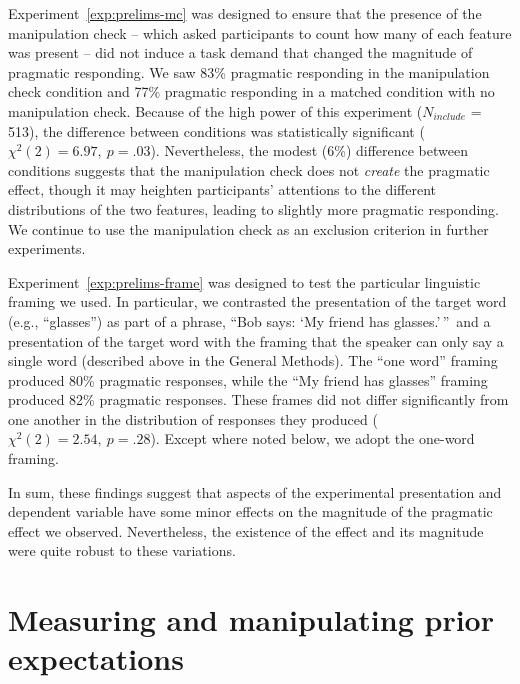 \documentclass[man]{apa6}
\newcounter{Experiment}
\newcommand{\exptref}[1]{Experiment~\ref{#1}}
\begin{document}
\exptref{exp:prelims-mc} was designed to ensure that the presence of the manipulation check -- which asked participants to count how many of each feature was present -- did not induce a task demand that changed the magnitude of pragmatic responding. We saw 83\% pragmatic responding in the manipulation check condition and 77\% pragmatic responding in a matched condition with no manipulation check. Because of the high power of this experiment ($N_{include}$ = 513), the difference between conditions was statistically significant ($\chi^2(2) = 6.97,~p = .03$). Nevertheless, the modest (6\%) difference between conditions suggests that the manipulation check does not \emph{create} the pragmatic effect, though it may heighten participants' attentions to the different distributions of the two features, leading to slightly more pragmatic responding. We continue to use the manipulation check as an exclusion criterion in further experiments.

\exptref{exp:prelims-frame} was designed to test the particular linguistic framing we used. In particular, we contrasted the presentation of the target word (e.g., ``glasses'') as part of a phrase, ``Bob says: `My friend has glasses.'\,''\ and a presentation of the target word with the framing that the speaker can only say a single word (described above in the General Methods). The ``one word'' framing produced 80\% pragmatic responses, while the ``My friend has glasses'' framing produced 82\% pragmatic responses. These frames did not differ significantly from one another in the distribution of responses they produced ($\chi^2(2) = 2.54,~p = .28$). Except where noted below, we adopt the one-word framing.

In sum, these findings suggest that aspects of the experimental presentation and dependent variable have some minor effects on the magnitude of the pragmatic effect we observed. Nevertheless, the existence of the effect and its magnitude were quite robust to these variations.

\section{Measuring and manipulating prior expectations}
\label{sec:prior}
\end{document}
